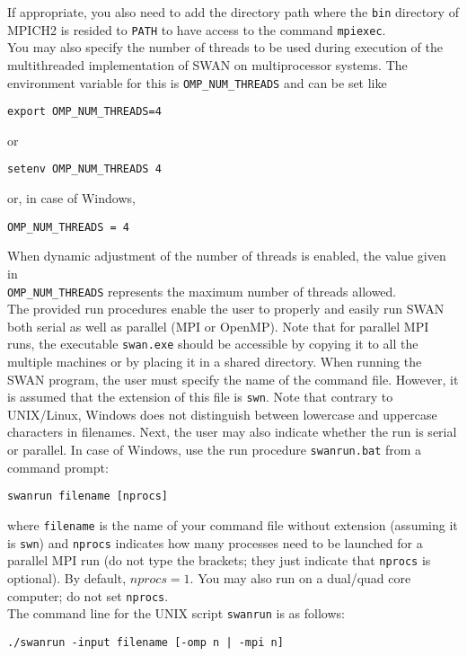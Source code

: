\documentclass[12pt]{book}
\begin{document}
\noindent
If appropriate, you also need to add the directory path where the {\tt bin} directory of MPICH2
is resided to {\small \tt PATH} to have access to the command {\tt mpiexec}.
\\[2ex]
\noindent
You may also specify the number of threads to be used during execution of the multithreaded
implementation of SWAN on multiprocessor systems. The environment variable for this is
{\small \tt OMP\_NUM\_THREADS} and can be set like
\begin{verbatim}
export OMP_NUM_THREADS=4
\end{verbatim}
or
\begin{verbatim}
setenv OMP_NUM_THREADS 4
\end{verbatim}
or, in case of Windows,
\begin{verbatim}
OMP_NUM_THREADS = 4
\end{verbatim}
When dynamic adjustment of the number of threads is enabled, the value given in\\
{\small \tt OMP\_NUM\_THREADS} represents the maximum number of threads allowed.
\\[2ex]
\noindent
The provided run procedures enable the user to properly and easily run SWAN both serial as
well as parallel (MPI or OpenMP). Note that for parallel MPI runs, the executable {\tt swan.exe}
should be accessible by copying it to all the multiple machines or by placing it in a shared
directory. When running the SWAN program, the user must specify the name of the command file.
However, it is assumed that the extension of this file is {\tt swn}. Note that contrary to
UNIX/Linux, Windows does not distinguish between lowercase and uppercase characters in filenames.
Next, the user may also indicate whether the run is serial or parallel. In case of Windows, use
the run procedure {\tt swanrun.bat} from a command prompt:
\begin{verbatim}
swanrun filename [nprocs]
\end{verbatim}
where {\tt filename} is the name of your command file without extension (assuming it is {\tt swn})
and {\tt nprocs} indicates how many processes need to be launched for a parallel MPI run (do not
type the brackets; they just indicate that {\tt nprocs} is optional). By default, $nprocs = 1$.
You may also run on a dual/quad core computer; do not set {\tt nprocs}.
\\[2ex]
\noindent
The command line for the UNIX script {\tt swanrun} is as follows:
\begin{verbatim}
./swanrun -input filename [-omp n | -mpi n]
\end{verbatim}
\end{document}
